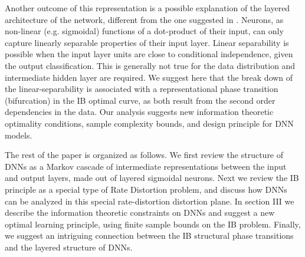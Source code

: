 \documentclass[11pt]{article}
\newcommand{\ignore}[1]{}
\begin{document}
{Another outcome of this representation is a possible explanation of the layered 
architecture of the network, different from the one suggested in \cite{MP-SD-2014}.  
Neurons, as non-linear (e.g. sigmoidal) functions of a dot-product of their input, can only capture
linearly separable properties of their input layer.  Linear separability is  possible when the
input layer units are close to conditional independence, given the output classification. 
This is generally not true for the data distribution and intermediate hidden layer are required.
We suggest here that the break down of the linear-separability is associated with a representational 
phase transition (bifurcation) in the IB optimal curve, as both result from the 
second order dependencies in the data. Our analysis suggests new information theoretic optimality conditions, sample complexity bounds, and design principle for DNN models. 

The rest of the paper is organized as follows. We first review the structure of DNNs as a Markov cascade
of intermediate representations between the input and output layers, made out of layered sigmoidal neurons.
Next we review the IB principle as a special type of Rate Distortion problem, and 
discuss how DNNs can be analyzed in this special rate-distortion distortion plane. In section III we describe
the information theoretic constraints on DNNs and suggest a new optimal learning principle, using finite sample 
bounds on the IB problem. Finally, we suggest an intriguing connection between the IB structural phase transitions and the layered structure of DNNs.

\ignore{The role of the
other layers in deep learning is thus to remove the redundancies in
the input layers, namely, to compress them, without loss of information
relevant to the classification task. We argue that the latter is optimally
captured by constraining the mutual information between the hidden
layers representation and the output classification.}
}


\ignore{Finally, we argue that the optimized hidden layers end at special points on the IB bound, which can be predicted solely from the statistics of the data. }

\end{document}
